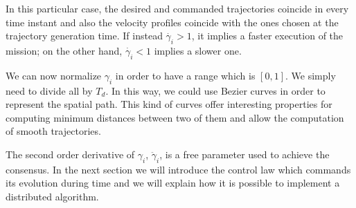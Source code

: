 In this particular case, the desired and commanded trajectories coincide
in every time instant and also the velocity profiles coincide with the ones
chosen at the trajectory generation time.
If instead $\dot{\gamma_i} > 1$, it implies a faster execution of the mission;
on the other hand, $\dot{\gamma_i} < 1$ implies a slower one.

We can now normalize $\gamma_i$ in order to have a range which is $[0,1]$. We simply
need to divide all by $T_d$. In this way, we could use Bezier curves in order to
represent the spatial path. This kind of curves offer interesting properties for
computing minimum distances between two of them and allow the computation of
smooth trajectories.

The second order derivative of $\gamma_i$, $\ddot{\gamma}_i$, is a free parameter
used to achieve the consensus. In the next section we will introduce the control law
which commands its evolution during time and we will explain how it is possible to
implement a distributed algorithm.
